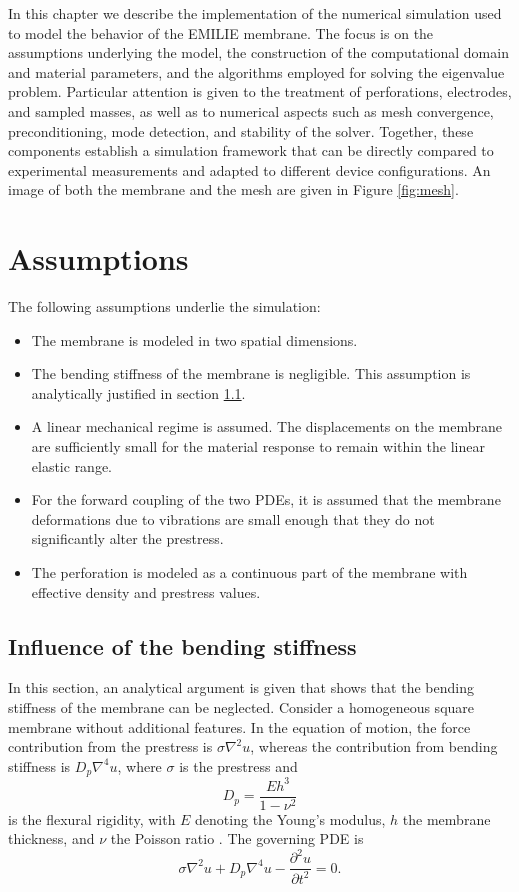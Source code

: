 
In this chapter we describe the implementation of the numerical simulation used to model the behavior of the EMILIE membrane. The focus is on the assumptions underlying the model, the construction of the computational domain and material parameters, and the algorithms employed for solving the eigenvalue problem. Particular attention is given to the treatment of perforations, electrodes, and sampled masses, as well as to numerical aspects such as mesh convergence, preconditioning, mode detection, and stability of the solver. Together, these components establish a simulation framework that can be directly compared to experimental measurements and adapted to different device configurations. An image of both the membrane and the mesh are given in Figure \ref{fig:mesh}.\\

\section{Assumptions}
\label{sec:assumptions}
The following assumptions underlie the simulation: 
\begin{itemize}
    \item The membrane is modeled in two spatial dimensions.
    \item The bending stiffness of the membrane is negligible. This assumption is analytically justified in section \ref{sec:bending_stiffness}.
    \item A linear mechanical regime is assumed. The displacements on the membrane are sufficiently small for the material response to remain within the linear elastic range.
    \item For the forward coupling of the two PDEs, it is assumed that the membrane deformations due to vibrations are small enough that they do not significantly alter the prestress.
    \item The perforation is modeled as a continuous part of the membrane with effective density and prestress values.
\end{itemize}

\subsection{Influence of the bending stiffness}
\label{sec:bending_stiffness}
In this section, an analytical argument is given that shows that the bending stiffness of the membrane can be neglected. Consider a homogeneous square membrane without additional features. In the equation of motion, the force contribution from the prestress is $\sigma \nabla^2 u$, whereas the contribution from bending stiffness is $D_p \nabla^4 u$, where $\sigma$ is the prestress and 
\[
D_p = \frac{E h^3}{1-\nu^2}
\]
is the flexural rigidity, with $E$ denoting the Young's modulus, $h$ the membrane thickness, and $\nu$ the Poisson ratio \cite{schmid2016fundamentals}. The governing PDE is
\begin{equation}
    \sigma \nabla^2 u + D_p \nabla^4 u - \frac{\partial^2 u}{\partial t^2} = 0.
    \label{eq:kirchhoff_wave}
\end{equation}

